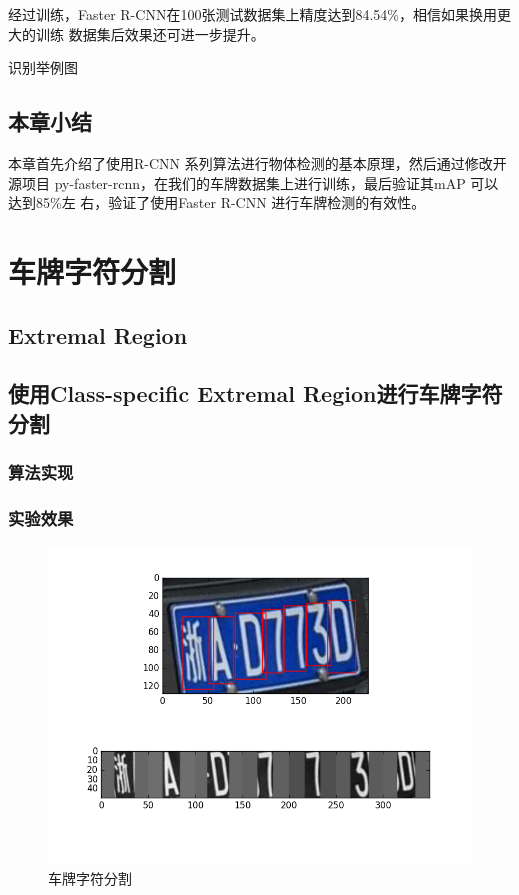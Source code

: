 经过训练，Faster R-CNN在100张测试数据集上精度达到84.54\%，相信如果换用更大的训练
数据集后效果还可进一步提升。

识别举例图

\section{本章小结}

本章首先介绍了使用R-CNN 系列算法进行物体检测的基本原理，然后通过修改开源项目
py-faster-rcnn，在我们的车牌数据集上进行训练，最后验证其mAP 可以达到85\%左
右，验证了使用Faster R-CNN 进行车牌检测的有效性。

\chapter{车牌字符分割}

\section{Extremal Region}

\section{使用Class-specific Extremal Region进行车牌字符分割}

\subsection{算法实现}

\subsection{实验效果}

\begin{figure}[th]
  \centering
  \includegraphics[width=0.8\linewidth]{./Figure/TextSegmentation.png}
  \caption{车牌字符分割}\label{Fig:TextSeg}
\end{figure}

